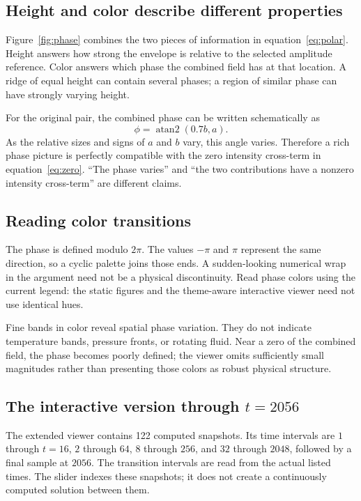 \documentclass[10pt]{article}
\begin{document}
\subsection{Height and color describe different properties}
Figure~\ref{fig:phase} combines the two pieces of information in equation~\eqref{eq:polar}. Height answers how strong the envelope is relative to the selected amplitude reference. Color answers which phase the combined field has at that location. A ridge of equal height can contain several phases; a region of similar phase can have strongly varying height.

For the original pair, the combined phase can be written schematically as
\begin{equation}
 \phi=\operatorname{atan2}(0.7b,a).
\end{equation}
As the relative sizes and signs of $a$ and $b$ vary, this angle varies. Therefore a rich phase picture is perfectly compatible with the zero intensity cross-term in equation~\eqref{eq:zero}. ``The phase varies'' and ``the two contributions have a nonzero intensity cross-term'' are different claims.

\subsection{Reading color transitions}
The phase is defined modulo $2\pi$. The values $-\pi$ and $\pi$ represent the same direction, so a cyclic palette joins those ends. A sudden-looking numerical wrap in the argument need not be a physical discontinuity. Read phase colors using the current legend: the static figures and the theme-aware interactive viewer need not use identical hues.

Fine bands in color reveal spatial phase variation. They do not indicate temperature bands, pressure fronts, or rotating fluid. Near a zero of the combined field, the phase becomes poorly defined; the viewer omits sufficiently small magnitudes rather than presenting those colors as robust physical structure.

\subsection{The interactive version through $t=2056$}
The extended viewer contains 122 computed snapshots. Its time intervals are $1$ through $t=16$, $2$ through $64$, $8$ through $256$, and $32$ through $2048$, followed by a final sample at $2056$. The transition intervals are read from the actual listed times. The slider indexes these snapshots; it does not create a continuously computed solution between them.
\end{document}
